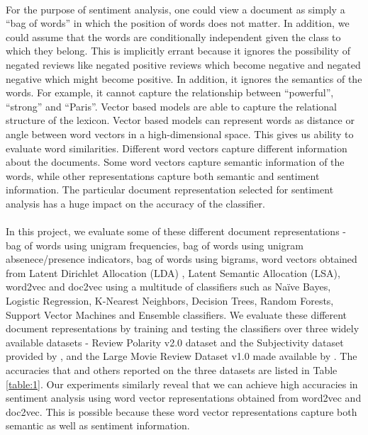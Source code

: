 \documentclass[11pt, oneside]{article}
\begin{document}
\paragraph{}
For the purpose of sentiment analysis, one could view a document as simply a ``bag of words'' in which the position of words does not matter. In addition, we could assume that the words are conditionally independent given the class to which they belong. This is implicitly errant because it ignores the possibility of negated reviews like negated positive reviews which become negative and negated negative which might become positive. In addition, it ignores the semantics of the words. For example, it cannot capture the relationship between ``powerful'', ``strong'' and ``Paris''. Vector based models are able to capture the relational structure of the lexicon. Vector based models can represent words as distance or angle between word vectors in a high-dimensional space. This gives us ability to evaluate word similarities. Different word vectors capture different information about the documents. Some word vectors capture semantic information of the words, while other representations capture both semantic and sentiment information. The particular document representation selected for sentiment analysis has a huge impact on the accuracy of the classifier.
\paragraph{}
In this project, we evaluate some of these different document representations - bag of words using unigram frequencies, bag of words using unigram absenece/presence indicators, bag of words using bigrams, word vectors obtained from Latent Dirichlet Allocation (LDA) \cite{blei2003latent}, Latent Semantic Allocation (LSA), word2vec \cite{le2014distributed} and doc2vec using a multitude of classifiers such as Naïve Bayes, Logistic Regression, K-Nearest Neighbors, Decision Trees, Random Forests, Support Vector Machines and Ensemble classifiers. We evaluate these different document representations by training and testing the classifiers over three widely available datasets - Review Polarity v2.0 dataset and the Subjectivity dataset provided by \cite{pang2004sentimental}, and the Large Movie Review Dataset v1.0 made available by \cite{maas2011learning}. The accuracies that \cite{maas2011learning} and others \cite{sadeghianbag} reported on the three datasets are listed in Table \ref{table:1}. Our experiments similarly reveal that we can achieve high accuracies in sentiment analysis using word vector representations obtained from word2vec and doc2vec. This is possible because these word vector representations capture both semantic as well as sentiment information. 
\end{document}

